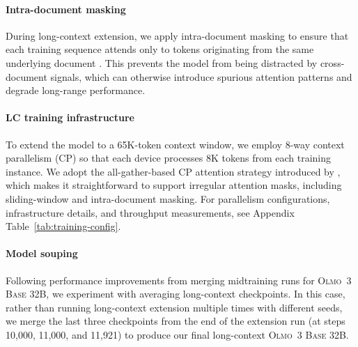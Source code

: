 \documentclass[table]{ai2style/ai2}
\newcommand{\newOlmo}{Olmo\xspace}
\newcommand{\olmothreebase}{\textsc{\newOlmo~3 Base}\xspace}
\begin{document}
\paragraph{Intra-document masking} During long-context extension, we apply intra-document masking to ensure that each training sequence attends only to tokens originating from the same underlying document \citep{zhao2024interdoc,dubey2024llama}. This prevents the model from being distracted by cross-document signals, which can otherwise introduce spurious attention patterns and degrade long-range performance.

\paragraph{LC training infrastructure} To extend the model to a 65K-token context window, we employ 8-way context parallelism (CP) so that each device processes 8K tokens from each training instance. We adopt the all-gather-based CP attention strategy introduced by \cite{scalingllama3}, which makes it straightforward to support irregular attention masks, including sliding-window and intra-document masking. For parallelism configurations, infrastructure details, and throughput measurements, see Appendix Table~\ref{tab:training-config}.

\paragraph{Model souping} Following performance improvements from merging midtraining runs for \olmothreebase 32B, we experiment with averaging long-context checkpoints. In this case, rather than running long-context extension multiple times with different seeds, we merge the last three checkpoints from the end of the extension run (at steps 10,000, 11,000, and 11,921) to produce our final long-context \olmothreebase 32B.
\end{document}
